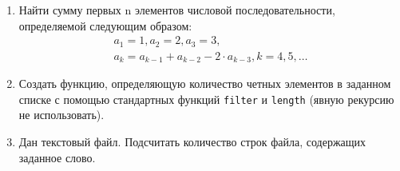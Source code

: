 \begin{enumerate}
    \itemsep=\myitemsep
    \item Найти сумму первых n элементов числовой последовательности,
    определяемой следующим образом:
    \begin{gather*} 
    a_1 = 1, a_2 = 2, a_3 = 3, \\
    a_k = a_{k-1} + a_{k-2} - 2 \cdot a_{k-3}, k = 4, 5, \ldots
    \end{gather*}
    
    \item Создать  функцию, определяющую количество четных элементов в заданном
    списке с помощью стандартных функций \texttt{filter} и \texttt{length}
    (явную рекурсию не использовать).
    
    \item Дан текстовый файл. Подсчитать количество строк файла, содержащих
    заданное слово.
\end{enumerate}